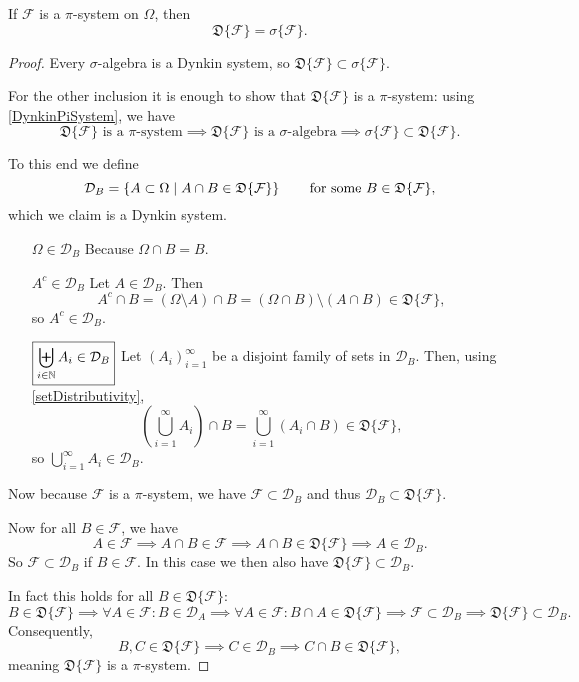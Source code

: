 \begin{proposition} \label{generatedDynkinSigma}
If $\mathcal{F}$ is a $\pi$-system on $\Omega$, then
\[ \mathfrak{D}\{\mathcal{F}\} = \sigma\{\mathcal{F}\}. \]
\end{proposition}
\begin{proof}
Every $\sigma$-algebra is a Dynkin system, so $\mathfrak{D}\{\mathcal{F}\} \subset \sigma\{\mathcal{F}\}$.

For the other inclusion it is enough to show that $\mathfrak{D}\{\mathcal{F}\}$ is a $\pi$-system: using \ref{DynkinPiSystem}, we have
\[ \text{$\mathfrak{D}\{\mathcal{F}\}$ is a $\pi$-system} \implies \text{$\mathfrak{D}\{\mathcal{F}\}$ is a $\sigma$-algebra} \implies \sigma\{\mathcal{F}\}\subset\mathfrak{D}\{\mathcal{F}\}. \]

To this end we define
\[ \mathcal{D}_B = \left\{ A\subset\Omega \;\middle|\; A\cap B\in\mathfrak{D}\{\mathcal{F}\} \right\} \qquad \text{for some $B\in\mathfrak{D}\{\mathcal{F}\}$,} \]
which we claim is a Dynkin system.
\begin{itemize}[leftmargin=2.5cm]
\item[$\boxed{\Omega\in\mathcal{D}_B}$] Because $\Omega\cap B = B$.
\item[$\boxed{A^c\in\mathcal{D}_B}$] Let $A\in\mathcal{D}_B$. Then
\[ A^c\cap B = (\Omega\setminus A)\cap B = (\Omega\cap B)\setminus(A\cap B) \in \mathfrak{D}\{\mathcal{F}\}, \]
so $A^c\in\mathcal{D}_B$.
\item[$\boxed{\biguplus_{i\in \mathbb{N}}A_i \in \mathcal{D}_B}$] Let $(A_i)_{i=1}^\infty$ be a disjoint family of sets in $\mathcal{D}_B$. Then, using \ref{setDistributivity},
\[ \left(\bigcup_{i=1}^\infty A_i\right)\cap B = \bigcup_{i=1}^\infty (A_i\cap B) \in \mathfrak{D}\{\mathcal{F}\}, \]
so $\bigcup_{i=1}^\infty A_i\in\mathcal{D}_B$.
\end{itemize}
Now because $\mathcal{F}$ is a $\pi$-system, we have $\mathcal{F}\subset\mathcal{D}_B$ and thus $\mathcal{D}_B\subset\mathfrak{D}\{\mathcal{F}\}$.

Now for all $B\in\mathcal{F}$, we have
\[ A\in\mathcal{F}\implies A\cap B\in\mathcal{F}\implies A\cap B\in\mathfrak{D}\{\mathcal{F}\} \implies A\in \mathcal{D}_B. \]
So $\mathcal{F}\subset \mathcal{D}_B$ if $B\in\mathcal{F}$. In this case we then also have $\mathfrak{D}\{\mathcal{F}\}\subset \mathcal{D}_B$.

In fact this holds for all $B\in\mathfrak{D}\{\mathcal{F}\}$:
\[ B\in\mathfrak{D}\{\mathcal{F}\} \implies \forall A\in\mathcal{F}: B\in\mathcal{D}_A \implies  \forall A\in\mathcal{F}: B\cap A \in \mathfrak{D}\{\mathcal{F}\} \implies \mathcal{F}\subset\mathcal{D}_B \implies \mathfrak{D}\{\mathcal{F}\}\subset \mathcal{D}_B. \]
Consequently,
\[ B,C\in\mathfrak{D}\{\mathcal{F}\} \implies C\in\mathcal{D}_B \implies C\cap B\in\mathfrak{D}\{\mathcal{F}\}, \]
meaning $\mathfrak{D}\{\mathcal{F}\}$ is a $\pi$-system.
\end{proof}
